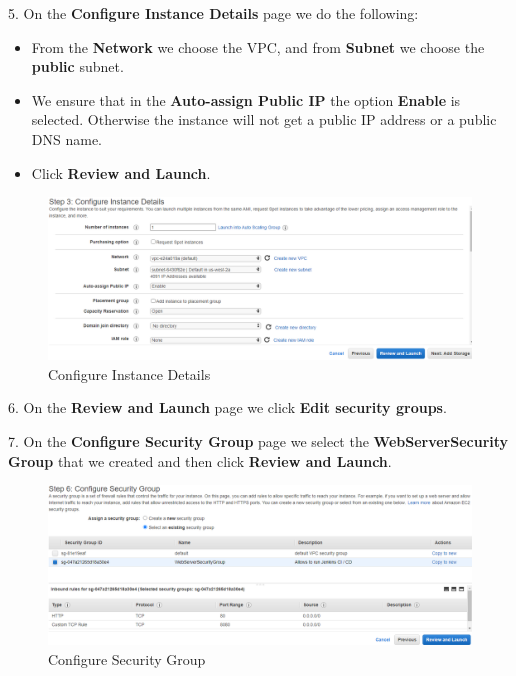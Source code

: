 \documentclass[12pt,a4paper,twoside]{article}
\begin{document}
5. On the \textbf{Configure Instance Details} page we do the following:


\begin{itemize}
	\item From the \textbf{Network} we choose the VPC, and from \textbf{Subnet} we choose the \textbf{public} subnet.
	\item We ensure that in the \textbf{Auto-assign Public IP} the option \textbf{Enable} is selected. Otherwise the instance will not
get a public IP address or a public DNS name.
	\item Click \textbf{Review and Launch}.
\end{itemize}


\begin{figure}[H]
    \centering
        \includegraphics[width=15cm]{images-aws/7-config-instance-details.png}
        \caption{Configure Instance Details}
\end{figure}


6. On the \textbf{Review and Launch} page we click \textbf{Edit security groups}.


7. On the \textbf{Configure Security Group} page we select the \textbf{WebServerSecurity Group} that we created and then click \textbf{Review and Launch}.


\begin{figure}[H]
    \centering
        \includegraphics[width=15cm]{images-aws/8-config-sec-group.png}
        \caption{Configure Security Group}
\end{figure}
\end{document}
